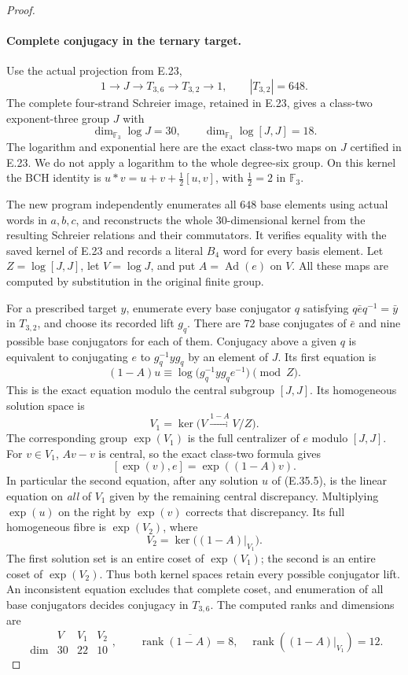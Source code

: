 \begin{proof}
\paragraph{Complete conjugacy in the ternary target.}
Use the actual projection from E.23,
\[
 1\longrightarrow J\longrightarrow T_{3,6}
       \longrightarrow T_{3,2}\longrightarrow1,
       \qquad |T_{3,2}|=648.
 \tag{E.35.3}
\]
The complete four-strand Schreier image, retained in
E.23, gives a class-two exponent-three group $J$ with
\[
 \dim_{\mathbb F_3}\log J=30,\qquad
 \dim_{\mathbb F_3}\log[J,J]=18.
 \tag{E.35.4}
\]
The logarithm and exponential here are the exact
class-two maps on $J$ certified in E.23. We do not
apply a logarithm to the whole degree-six group.
On this kernel the BCH identity is
$u*v=u+v+\frac12[u,v]$, with $\frac12=2$ in
$\mathbb F_3$.

The new program independently enumerates all $648$
base elements using actual words in $a,b,c$, and
reconstructs the whole $30$-dimensional kernel from
the resulting Schreier relations and their commutators.
It verifies equality with the saved kernel of E.23
and records a literal $B_4$ word for every basis
element. Let $Z=\log[J,J]$, let
$V=\log J$, and put $A=\operatorname{Ad}(e)$ on $V$.
All these maps are computed by substitution in the
original finite group.

For a prescribed target $y$, enumerate every base
conjugator $q$ satisfying
$q\bar e q^{-1}=\bar y$ in $T_{3,2}$, and choose its
recorded lift $g_q$. There are $72$ base conjugates
of $\bar e$ and nine possible base conjugators for
each of them. Conjugacy above a given $q$ is equivalent
to conjugating $e$ to $g_q^{-1}yg_q$ by an element
of $J$. Its first equation is
\[
 (1-A)u\equiv
   \log\bigl(g_q^{-1}yg_qe^{-1}\bigr)\pmod Z.
 \tag{E.35.5}
\]
This is the exact equation modulo the central subgroup
$[J,J]$. Its homogeneous solution space is
\[
 V_1=\ker\bigl(V\xrightarrow{1-A}V/Z\bigr).
\]
The corresponding group $\exp(V_1)$ is the full
centralizer of $e$ modulo $[J,J]$. For $v\in V_1$,
$Av-v$ is central, so the exact class-two formula gives
\[
                    [\exp(v),e]=\exp((1-A)v).
 \tag{E.35.6}
\]
In particular the second equation, after any solution
$u$ of (E.35.5), is the linear equation on \emph{all}
of $V_1$ given by the remaining central discrepancy.
Multiplying $\exp(u)$ on the right by $\exp(v)$
corrects that discrepancy. Its full homogeneous fibre
is $\exp(V_2)$, where
\[
 V_2=\ker\bigl((1-A)|_{V_1}\bigr).
 \tag{E.35.7}
\]
The first solution set is an entire coset of
$\exp(V_1)$; the second is an entire coset of
$\exp(V_2)$. Thus both kernel spaces retain every
possible conjugator lift. An inconsistent equation
excludes that complete coset, and enumeration of all
base conjugators decides conjugacy in $T_{3,6}$.
The computed ranks and dimensions are
\[
 \begin{array}{c|ccc}
       &V&V_1&V_2\\\hline
 \dim&30&22&10
 \end{array},
 \qquad
 \operatorname{rank}\overline{(1-A)}=8,
 \quad\operatorname{rank}((1-A)|_{V_1})=12.
 \tag{E.35.8}
\]


\end{proof}
